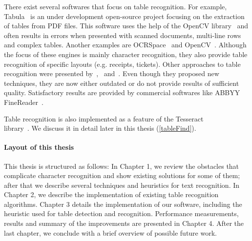 There exist several softwares that focus on table recognition. For example, Tabula~\cite{Tabula} is an under development open-source project focusing on the extraction of tables from PDF files. This software uses the help of the OpenCV library~\cite{OpenCV} and often results in errors when presented with scanned documents, multi-line rows and complex tables. Another examples are OCRSpace~\cite{OCRSpace} and OpenCV~\cite{OpenCV}. Although the focus of these engines is mainly character recognition, they also provide table recognition of specific layouts (e.g. receipts, tickets). Other approaches to table recognition were presented by~\citet{pdf2table},~\citet{TRecs} and~\citet{MediumTable}. Even though they proposed new techniques, they are now either outdated or do not provide results of sufficient quality. Satisfactory results are provided by commercial softwares like ABBYY FineReader~\cite{ABBYYdpi}.

Table recognition is also implemented as a feature of the Tesseract \\library~\cite{tableDetHeterogeneous}. We discuss it in detail later in this thesis (\cref{tableFind}).

\paragraph{Layout of this thesis} This thesis is structured as follows: In Chapter 1, we review the obstacles that complicate character recognition and show existing solutions for some of them; after that we describe several techniques and heuristics for text recognition. In Chapter 2, we describe the implementation of existing table recognition algorithms. Chapter 3 details the implementation of our software, including the heuristic used for table detection and recognition. Performance measurements, results and summary of the improvements are presented in Chapter 4. After the last chapter, we conclude with a brief overview of possible future work.
